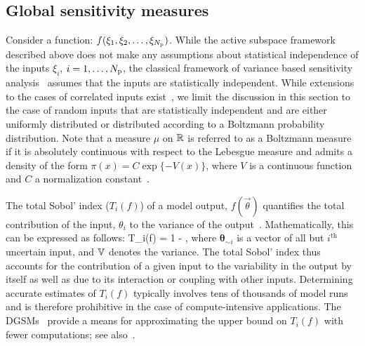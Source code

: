   

\subsection{Global sensitivity measures}

\label{sub:gsa}
Consider a function: $f(\xi_1, \xi_2, \ldots, \xi_{N_\text{p}})$. 
While the active subspace framework described above does not make any assumptions
about statistical independence of the inputs $\xi_i$, $i = 1, \ldots, {N_\text{p}}$, 
the classical 
framework of variance based sensitivity analysis~\cite{Sobol:2001, Saltelli:2010} 
assumes that the inputs
are statistically independent. While extensions to the cases 
of correlated inputs exist~\cite{Borgonovo:2007,Li:2010,Jacques:2006,Xu:2007,Hart:2017},
 we limit the discussion in this section to the
case of random inputs that are statistically independent and are 
either uniformly distributed or
distributed according to a Boltzmann probability distribution.
Note that a measure $\mu$
on $\mathbb{R}$ is referred to as a Boltzmann measure if it is 
absolutely continuous with respect to the Lebesgue measure  
and admits a density  of the form $\pi(x) = C \exp\{-V(x)\}$,
where $V$ is a continuous function and $C$ a normalization 
constant~\cite{Lamboni:2013}.


The total Sobol' index ($T_i(f)$) of a model output, $f(\vec\theta)$ quantifies
the total contribution of the input, $\theta_i$ to the variance of the
output~\cite{Sobol:2001}. Mathematically, this can be expressed as follows:
%
\be
T_i(f) = 1 - 
,
\label{eq:total}
\ee
%
where $\bm{\theta}_{\sim i}$ is a vector of all but $i^\text{th}$ uncertain
input, and $\mathbb{V}$ denotes the variance. The total Sobol' index thus accounts
for the contribution of a given input to the variability in the output by itself
as well as due to its interaction or coupling with other inputs. 
Determining accurate estimates of $T_i(f)$ typically involves tens of
thousands of model runs and is therefore prohibitive in the case of
compute-intensive applications. The DGSMs~\cite{Sobol:2009} provide a means for
approximating the upper bound on $T_i(f)$ with fewer computations; see 
also~\cite{Vohra:2018}. 

